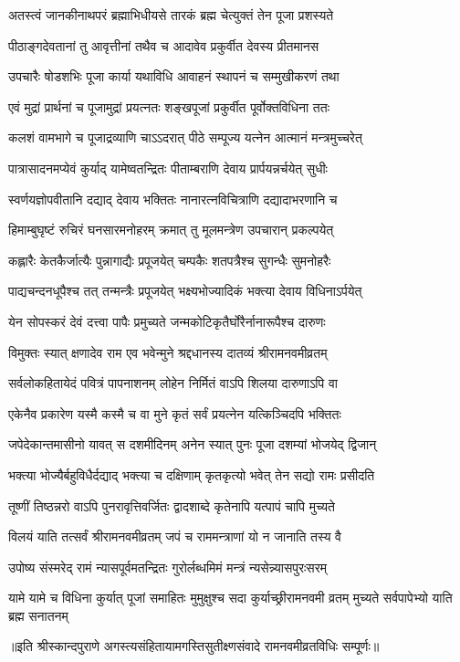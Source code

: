 \twolineshloka
{अतस्त्वं जानकीनाथपरं ब्रह्माभिधीयसे}
{तारकं ब्रह्म चेत्युक्तं तेन पूजा प्रशस्यते}%

\twolineshloka
{पीठाङ्गदेवतानां तु आवृत्तीनां तथैव च}
{आदावेव प्रकुर्वीत देवस्य प्रीतमानस}%

\twolineshloka
{उपचारैः षोडशभिः पूजा कार्या यथाविधि}
{आवाहनं स्थापनं च सम्मुखीकरणं तथा}%

\twolineshloka
{एवं मुद्रां प्रार्थनां च पूजामुद्रां प्रयत्नतः}
{शङ्खपूजां प्रकुर्वीत पूर्वोक्तविधिना ततः}%

\twolineshloka
{कलशं वामभागे च पूजाद्रव्याणि चाऽऽदरात्}
{पीठे सम्पूज्य यत्नेन आत्मानं मन्त्रमुच्चरेत्}%

\twolineshloka
{पात्रासादनमप्येवं कुर्याद् यामेष्वतन्द्रितः}
{पीताम्बराणि देवाय प्रार्पयन्नर्चयेत् सुधीः}%

\twolineshloka
{स्वर्णयज्ञोपवीतानि दद्याद् देवाय भक्तितः}
{नानारत्नविचित्राणि दद्यादाभरणानि च}%

\twolineshloka
{हिमाम्बुघृष्टं रुचिरं घनसारमनोहरम्}
{क्रमात् तु मूलमन्त्रेण उपचारान् प्रकल्पयेत्}%

\twolineshloka
{कह्लारैः केतकैर्जात्यैः पुन्नागाद्यैः प्रपूजयेत्}
{चम्पकैः शतपत्रैश्च सुगन्धैः सुमनोहरैः}%

\twolineshloka
{पाद्यचन्दनधूपैश्च तत् तन्मन्त्रैः प्रपूजयेत्}
{भक्ष्यभोज्यादिकं भक्त्या देवाय विधिनाऽर्पयेत्}%

\twolineshloka
{येन सोपस्करं देवं दत्त्वा पापैः प्रमुच्यते}
{जन्मकोटिकृतैर्घोरैर्नानारूपैश्च दारुणः}%

\twolineshloka
{विमुक्तः स्यात् क्षणादेव राम एव भवेन्मुने}
{श्रद्दधानस्य दातव्यं श्रीरामनवमीव्रतम्}%

\twolineshloka
{सर्वलोकहितायेदं पवित्रं पापनाशनम्}
{लोहेन निर्मितं वाऽपि शिलया दारुणाऽपि वा}%

\twolineshloka
{एकेनैव प्रकारेण यस्मै कस्मै च वा मुने}
{कृतं सर्वं प्रयत्नेन यत्किञ्चिदपि भक्तितः}%

\twolineshloka
{जपेदेकान्तमासीनो यावत् स दशमीदिनम्}
{अनेन स्यात् पुनः पूजा दशम्यां भोजयेद् द्विजान्}%

\twolineshloka
{भक्त्या भोज्यैर्बहुविधैर्दद्याद् भक्त्या च दक्षिणाम्}
{कृतकृत्यो भवेत् तेन सद्यो रामः प्रसीदति}%

\twolineshloka
{तूष्णीं तिष्ठन्नरो वाऽपि पुनरावृत्तिवर्जितः}
{द्वादशाब्दे कृतेनापि यत्पापं चापि मुच्यते}%
 
\twolineshloka
{विलयं याति तत्सर्वं श्रीरामनवमीव्रतम्}
{जपं च राममन्त्राणां यो न जानाति तस्य वै}%

\twolineshloka
{उपोष्य संस्मरेद् रामं न्यासपूर्वमतन्द्रितः}
{गुरोर्लब्धमिमं मन्त्रं न्यसेन्न्यासपुरःसरम्}%

\threelineshloka
{यामे यामे च विधिना कुर्यात् पूजां समाहितः}
{मुमुक्षुश्च सदा कुर्याच्छ्रीरामनवमी व्रतम्}
{मुच्यते सर्वपापेभ्यो याति ब्रह्म सनातनम्}%

॥इति श्रीस्कान्दपुराणे अगस्त्यसंहितायामगस्तिसुतीक्ष्णसंवादे रामनवमी\-व्रत\-विधिः सम्पूर्णः॥
